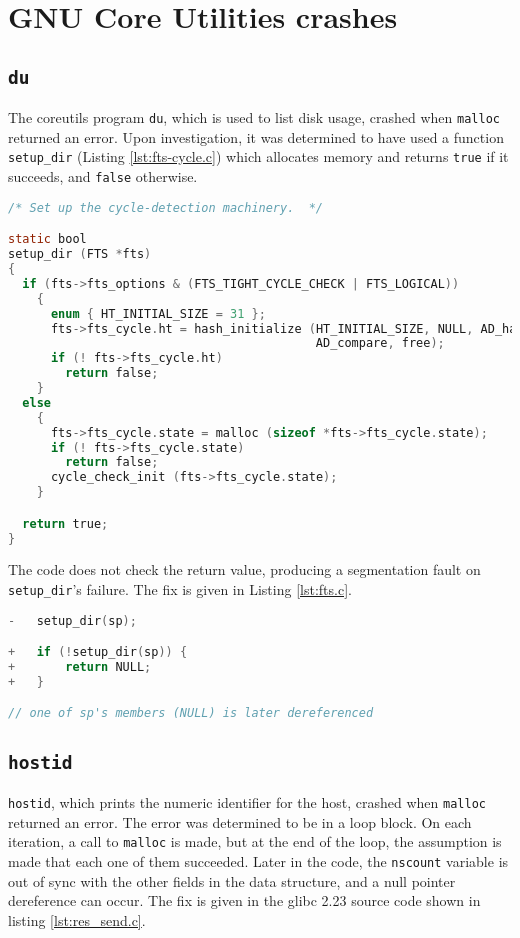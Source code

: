 \section{GNU Core Utilities crashes}
\label{appendix:coreutils}
\subsection{\texttt{du}}
The coreutils program \texttt{du}, which is used to list disk usage, crashed when \texttt{malloc} returned an error. Upon investigation, it was determined to have used a function \texttt{setup\_dir} (Listing \ref{lst:fts-cycle.c}) which allocates memory and returns \texttt{true} if it succeeds, and \texttt{false} otherwise.

\begin{lstlisting}[label={lst:fts-cycle.c},firstnumber=47, caption={\texttt{lib/fts-cycle.c}}, language=C]
/* Set up the cycle-detection machinery.  */

static bool
setup_dir (FTS *fts)
{
  if (fts->fts_options & (FTS_TIGHT_CYCLE_CHECK | FTS_LOGICAL))
    {
      enum { HT_INITIAL_SIZE = 31 };
      fts->fts_cycle.ht = hash_initialize (HT_INITIAL_SIZE, NULL, AD_hash,
                                           AD_compare, free);
      if (! fts->fts_cycle.ht)
        return false;
    }
  else
    {
      fts->fts_cycle.state = malloc (sizeof *fts->fts_cycle.state);
      if (! fts->fts_cycle.state)
        return false;
      cycle_check_init (fts->fts_cycle.state);
    }

  return true;
}
\end{lstlisting}

The code does not check the return value, producing a segmentation fault on \texttt{setup\_dir}'s failure.
 The fix is given in Listing \ref{lst:fts.c}.
\begin{lstlisting}[label={lst:fts.c},firstnumber=986, caption={\texttt{lib/fts.c}}, language=C]
-	setup_dir(sp);

+	if (!setup_dir(sp)) {
+		return NULL;
+	}

// one of sp's members (NULL) is later dereferenced
\end{lstlisting}

\subsection{\texttt{hostid}}
\texttt{hostid}, which prints the numeric identifier for the host, crashed when \texttt{malloc} returned an error. The error was determined to be in a loop block. On each iteration, a call to \texttt{malloc} is made, but at the end of the loop, the assumption is made that each one of them succeeded. Later in the code, the \texttt{nscount} variable is out of sync with the other fields in the data structure, and a null pointer dereference can occur. The fix is given in the glibc 2.23 source code shown in listing \ref{lst:res_send.c}.

